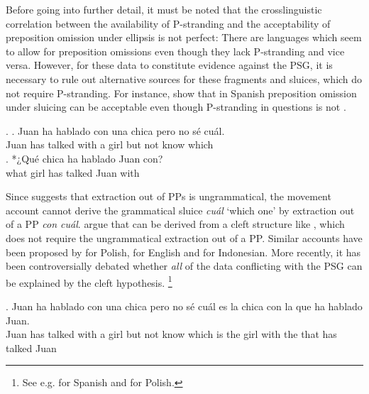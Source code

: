 Before going into further detail, it must be noted that the crosslinguistic correlation between the availability of P-stranding and the acceptability of preposition omission under ellipsis is not perfect: There are languages which seem to allow for preposition omissions even though they lack P-stranding and vice versa. However, for these data to constitute evidence against the PSG, it is necessary to rule out alternative sources for these fragments and sluices, which do not require P-stranding. For instance, \citet[176]{rodrigues.etal2009} show that in Spanish preposition omission under sluicing can be acceptable \Next[a] even though P-stranding in questions is not \Next[b].

\ex.
\ag. Juan ha hablado con una chica pero no sé cuál.\\
Juan has talked with a girl but not know which\\
\bg. *¿Qué chica ha hablado Juan con?\\
what girl has talked Juan with\\

Since \Last[b] suggests that extraction out of PPs is ungrammatical, the movement account cannot derive the grammatical sluice \textit{cuál} `which one' by extraction out of a PP \textit{con cuál}. \citet[178]{rodrigues.etal2009} argue that \Last[a] can be derived from a cleft structure like \Next, which does not require the ungrammatical extraction out of a PP. Similar accounts have been proposed by \citet{szczegielniak2008} for Polish, \citet{vancraenenbroeck2010} for English and \citet{sato2011} for Indonesian. More recently, it has been controversially debated whether \textit{all} of the data conflicting with the PSG can be explained by the cleft hypothesis.%
%
\footnote{See e.g. \citet{stigliano2018, stigliano2019} for Spanish and \citet{nykiel2013} for Polish.}\afterfn%
%

\exg. Juan ha hablado con una chica pero no sé cuál es la chica con la que ha hablado Juan.\\
Juan has talked with a girl but not know which is the girl with the that has talked Juan\\

